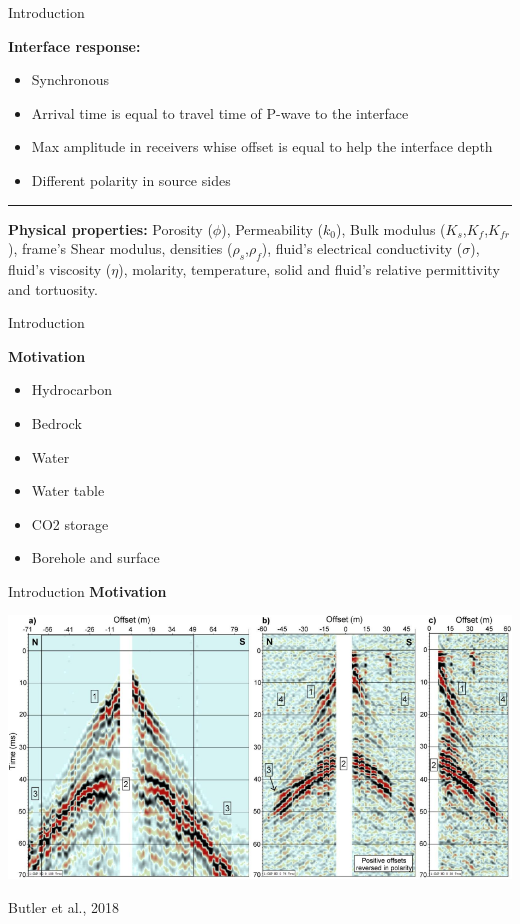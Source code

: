 \documentclass[utf8]{beamer} \usetheme{lfcr} %
\begin{document}
%
\begin{frame}{Introduction}
  \begin{center}
        \textbf{Interface response:}
        \begin{itemize}
          \item Synchronous
          \item Arrival time is equal to travel time of P-wave to the interface
          \item Max amplitude in receivers whise offset is equal to help the interface depth
          \item Different polarity in source sides
        \end{itemize}

        \rule{\textwidth}{1pt}

    \textbf{Physical properties:}
    Porosity ($\phi$), Permeability ($k_{0}$), Bulk modulus ($K_{s}$,$K_{f}$,$K_{fr}$), frame's Shear
    modulus, densities ($\rho_{s}$,$\rho_{f}$), fluid's electrical conductivity ($\sigma$),
    fluid's viscosity ($\eta$), molarity, temperature, solid and fluid's relative
    permittivity and tortuosity.
  \end{center}
\end{frame}%
%
\begin{frame}{Introduction}

  \textbf{Motivation}

  \begin{itemize}
    \item Hydrocarbon
    \item Bedrock
    \item Water
    \item Water table
    \item CO2 storage
    \item Borehole and surface
  \end{itemize}

\end{frame}
%
\begin{frame}{Introduction}
  \textbf{Motivation}

  \vspace{3.5cm}

  \begin{center}
    \includegraphics[width=\textwidth]{2018Butleretal_Ex_Field.png}
  \end{center}

  \begin{flushleft}
    {\small Butler et al., 2018}
  \end{flushleft}


\end{frame}
%
\end{document}
